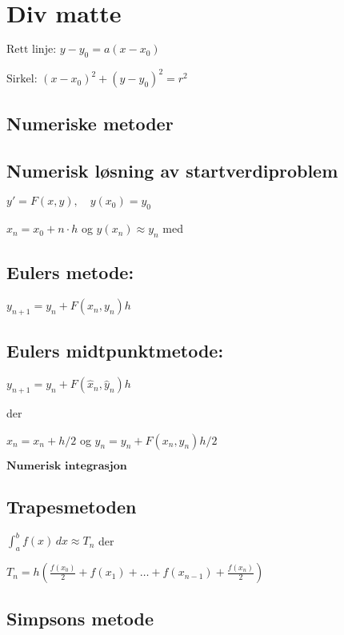 \documentclass[a4paper,7pt,fleqn]{article}
\begin{document}
\newpage
\section{Div matte}
\(\text{Rett linje: } y - y_0 = a(x - x_0)\)  

\(\text{Sirkel: } (x - x_0)^2 + (y - y_0)^2 = r^2\) 

\newpage

\begin{multicols}{2}
    

\section{Numeriske metoder}
\subsection{Numerisk løsning av startverdiproblem}  

\( y' = F(x,y), \quad y(x_0) = y_0 \)  

\( x_n = x_0 + n \cdot h \) og \( y(x_n) \approx y_n \) med  

\subsection{Eulers metode:}  

\( y_{n+1} = y_n + F(x_n, y_n) h \)  

\subsection{Eulers midtpunktmetode:}  

\( y_{n+1} = y_n + F(\hat{x}_n, \hat{y}_n) h \)  

der  

\( \hat{x}_n = x_n + h/2 \) og \( \hat{y}_n = y_n + F(x_n, y_n) h/2 \)  

\(\textbf{Numerisk integrasjon}\)  

\subsection{Trapesmetoden}  

\(\int_{a}^{b} f(x) \,dx \approx T_n\) der  

\( T_n = h \left( \frac{f(x_0)}{2} + f(x_1) + \dots + f(x_{n-1}) + \frac{f(x_n)}{2} \right) \)  

\subsection{Simpsons metode}  


\end{multicols}
\end{document}
